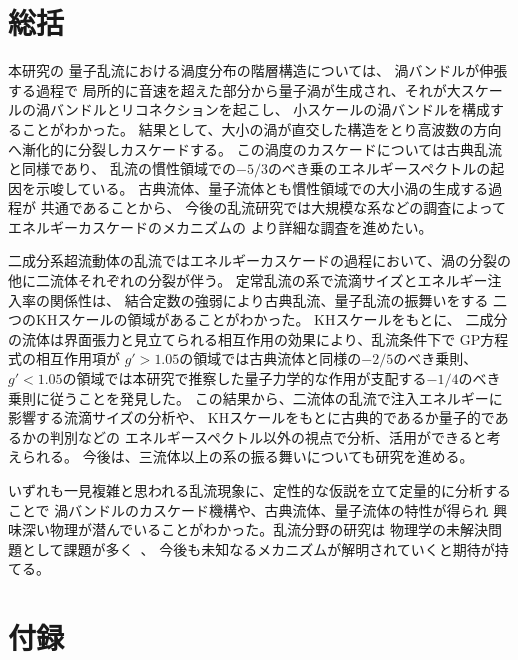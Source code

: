 \documentclass[12pt,a4paper]{jbook}
\begin{document}
	\chapter{総括}
	    本研究の
        量子乱流における渦度分布の階層構造については、
	    渦バンドルが伸張する過程で
        局所的に音速を超えた部分から量子渦が生成され、それが大スケールの渦バンドルとリコネクションを起こし、
        小スケールの渦バンドルを構成することがわかった。
	    結果として、大小の渦が直交した構造をとり高波数の方向へ漸化的に分裂しカスケードする。
        この渦度のカスケードについては古典乱流と同様であり、
	    乱流の慣性領域での$-5/3$のべき乗のエネルギースペクトルの起因を示唆している。
        古典流体、量子流体とも慣性領域での大小渦の生成する過程が
        共通であることから、
        今後の乱流研究では大規模な系などの調査によってエネルギーカスケードのメカニズムの
        より詳細な調査を進めたい。


        二成分系超流動体の乱流ではエネルギーカスケードの過程において、渦の分裂の他に二流体それぞれの分裂が伴う。
        定常乱流の系で流滴サイズとエネルギー注入率の関係性は、
		結合定数の強弱により古典乱流、量子乱流の振舞いをする
        二つのKHスケールの領域があることがわかった。
        KHスケールをもとに、
        二成分の流体は界面張力と見立てられる相互作用の効果により、乱流条件下で
		GP方程式の相互作用項が
		$g'>1.05$の領域では古典流体と同様の$-2/5$のべき乗則、
		$g'<1.05$の領域では本研究で推察した量子力学的な作用が支配する$-1/4$のべき乗則に従うことを発見した。
        この結果から、二流体の乱流で注入エネルギーに影響する流滴サイズの分析や、
        KHスケールをもとに古典的であるか量子的であるかの判別などの
        エネルギースペクトル以外の視点で分析、活用ができると考えられる。
        今後は、三流体以上の系の振る舞いについても研究を進める。


        いずれも一見複雑と思われる乱流現象に、定性的な仮説を立て定量的に分析することで
        渦バンドルのカスケード機構や、古典流体、量子流体の特性が得られ
        興味深い物理が潜んでいることがわかった。乱流分野の研究は
        物理学の未解決問題として課題が多く~\cite{Ginzburg}、
        今後も未知なるメカニズムが解明されていくと期待が持てる。
		


	\chapter{付録}
		\appendix
		\def\thesection{付録}
\end{document}
